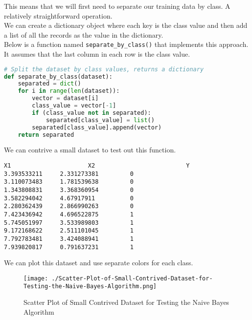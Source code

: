 \documentclass[12pt]{article}
\begin{document}
This means that we will first need to separate our training data by class. A relatively straightforward operation.\\

We can create a dictionary object where each key is the class value and then add a list of all the records as the value in the dictionary.\\

Below is a function named \verb|separate_by_class()| that implements this approach. It assumes that the last column in each row is the class value.

\newpage

\begin{lstlisting}[language=python]
# Split the dataset by class values, returns a dictionary
def separate_by_class(dataset):
	separated = dict()
	for i in range(len(dataset)):
		vector = dataset[i]
		class_value = vector[-1]
		if (class_value not in separated):
			separated[class_value] = list()
		separated[class_value].append(vector)
	return separated

\end{lstlisting}

We can contrive a small dataset to test out this function.\\

\begin{lstlisting}
X1						X2							Y
3.393533211		2.331273381			0
3.110073483		1.781539638			0
1.343808831		3.368360954			0
3.582294042		4.67917911			0
2.280362439		2.866990263			0
7.423436942		4.696522875			1
5.745051997		3.533989803			1
9.172168622		2.511101045			1
7.792783481		3.424088941			1
7.939820817		0.791637231			1

\end{lstlisting}

We can plot this dataset and use separate colors for each class.

\newpage

\immediate{}
\begin{figure}
\centering
\texttt{[image: ./Scatter-Plot-of-Small-Contrived-Dataset-for-Testing-the-Naive-Bayes-Algorithm.png]}
\caption{Scatter Plot of Small Contrived Dataset for Testing the Naive Bayes Algorithm}
\end{figure}
\end{document}
